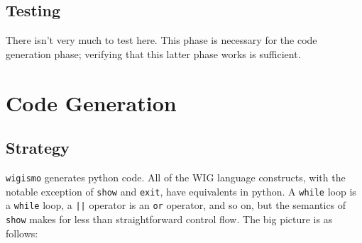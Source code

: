 \documentclass{WigReport}
\begin{document}
\subsection{Testing}
There isn't very much to test here. This phase is necessary for the code
generation phase; verifying that this latter phase works is sufficient.

\clearpage

\section{Code Generation}
\subsection{Strategy}
{\tt wigismo} generates python code. All of the WIG language constructs, 
with the notable exception of {\tt show} and {\tt exit}, have equivalents
in python. A {\tt while} loop is a {\tt while} loop, a {\tt ||} operator is
an {\tt or} operator, and so on, but the semantics of {\tt show} makes for
less than straightforward control flow. The big picture is as follows:
\end{document}
